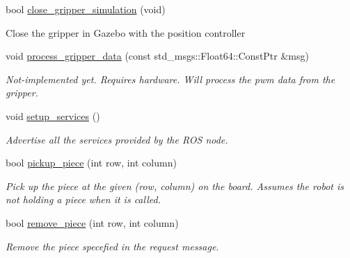 \begin{DoxyCompactItemize}
\mbox{\label{classgo__motion__planner_aed6123e33622ebff3b420479e1fd6141}} 
bool \hyperlink{classgo__motion__planner_aed6123e33622ebff3b420479e1fd6141}{close\+\_\+gripper\+\_\+simulation} (void)
\begin{DoxyCompactList}\small\item\em 
\begin{DoxyItemize}
\item Close the gripper in Gazebo with the position controller 
\end{DoxyItemize}\end{DoxyCompactList}\item 
\mbox{\label{classgo__motion__planner_a7b79595d9f86b059309f73ca16969c34}} 
void \hyperlink{classgo__motion__planner_a7b79595d9f86b059309f73ca16969c34}{process\+\_\+gripper\+\_\+data} (const std\+\_\+msgs\+::\+Float64\+::\+Const\+Ptr \&msg)
\begin{DoxyCompactList}\small\item\em Not-\/implemented yet. Requires hardware. Will process the pwm data from the gripper. \end{DoxyCompactList}\item 
\mbox{\label{classgo__motion__planner_a9a27e25a326f322f6c4c766029ed081d}} 
void \hyperlink{classgo__motion__planner_a9a27e25a326f322f6c4c766029ed081d}{setup\+\_\+services} ()
\begin{DoxyCompactList}\small\item\em Advertise all the services provided by the R\+OS node. \end{DoxyCompactList}\item 
bool \hyperlink{classgo__motion__planner_acda1c3562a9863181f4dbd1deaff3ff3}{pickup\+\_\+piece} (int row, int column)
\begin{DoxyCompactList}\small\item\em Pick up the piece at the given (row, column) on the board. Assumes the robot is not holding a piece when it is called. \end{DoxyCompactList}\item 
bool \hyperlink{classgo__motion__planner_a29c727d02a06b13b39e907384c71eb1e}{remove\+\_\+piece} (int row, int column)
\begin{DoxyCompactList}\small\item\em Remove the piece specefied in the request message. \end{DoxyCompactList}\item 

\end{DoxyCompactItemize}
